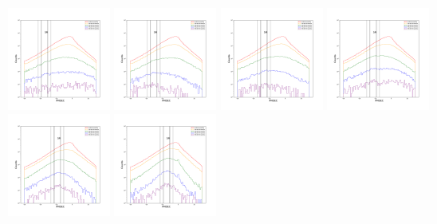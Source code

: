 \documentclass[12pt,prd]{article}
\begin{document}
\begin{figure}[h!]
\includegraphics[width=0.24\textwidth]{../figures/scanning_plotsgaiascan_l78_8_b58_4_ra224_7_dec46_3_npy_4.pdf}
\includegraphics[width=0.24\textwidth]{../figures/scanning_plotsgaiascan_l78_8_b58_4_ra224_7_dec46_3_npy_5.pdf}
\includegraphics[width=0.24\textwidth]{../figures/scanning_plotsgaiascan_l78_8_b58_4_ra224_7_dec46_3_npy_6.pdf}
\includegraphics[width=0.24\textwidth]{../figures/scanning_plotsgaiascan_l78_8_b58_4_ra224_7_dec46_3_npy_7.pdf}
\includegraphics[width=0.24\textwidth]{../figures/scanning_plotsgaiascan_l78_8_b58_4_ra224_7_dec46_3_npy_8.pdf}
\includegraphics[width=0.24\textwidth]{../figures/scanning_plotsgaiascan_l78_8_b58_4_ra224_7_dec46_3_npy_9.pdf}

\end{figure}
\end{document}
